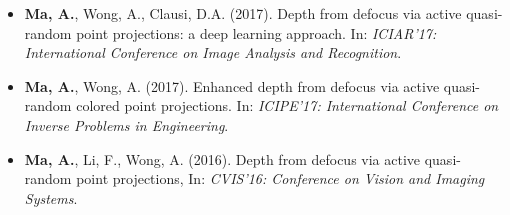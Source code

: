 \begin{adjustwidth}{\indentleft}{\indentright}
\begin{itemize}
            \item \textbf{Ma, A.}, Wong, A., Clausi, D.A. (2017). Depth from defocus via active quasi-random point projections: a deep learning approach. In: \emph{ICIAR'17: International Conference on Image Analysis and Recognition}.
            
            \item \textbf{Ma, A.}, Wong, A. (2017). Enhanced depth from defocus via active quasi-random colored point projections. In: \emph{ICIPE'17: International Conference on Inverse Problems in Engineering}.
                   
            \item \textbf{Ma, A.}, Li, F., Wong, A. (2016). Depth from defocus via active quasi-random point projections, In: \emph{CVIS'16: Conference on Vision and Imaging Systems}.
       
        \end{itemize}
        \hfill
        
        
 
        
    \end{adjustwidth}
